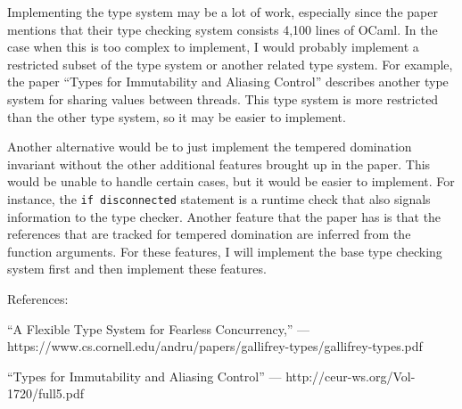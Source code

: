 \documentclass{article}
\begin{document}
  Implementing the type system may be a lot of work,
    especially since the paper mentions that their type checking system
    consists 4,100 lines of OCaml.
  In the case when this is too complex to implement,
    I would probably implement a restricted subset of the type system
    or another related type system.
  For example,
    the paper ``Types for Immutability and Aliasing Control''
    describes another type system for sharing values between threads.
  This type system is more restricted than the other type system,
    so it may be easier to implement.

  Another alternative would be to just implement the tempered domination invariant
    without the other additional features brought up in the paper.
  This would be unable to handle certain cases,
    but it would be easier to implement.
  For instance,
    the \verb+if disconnected+ statement is a runtime check
    that also signals information to the type checker.
  Another feature that the paper has
    is that the references that are tracked for tempered domination
    are inferred from the function arguments.
  For these features,
    I will implement the base type checking system first
    and then implement these features.

  References:

  ``A Flexible Type System for Fearless Concurrency,'' ---
  https://www.cs.cornell.edu/andru/papers/gallifrey-types/gallifrey-types.pdf

 ``Types for Immutability and Aliasing Control'' ---
 http://ceur-ws.org/Vol-1720/full5.pdf
\end{document}
